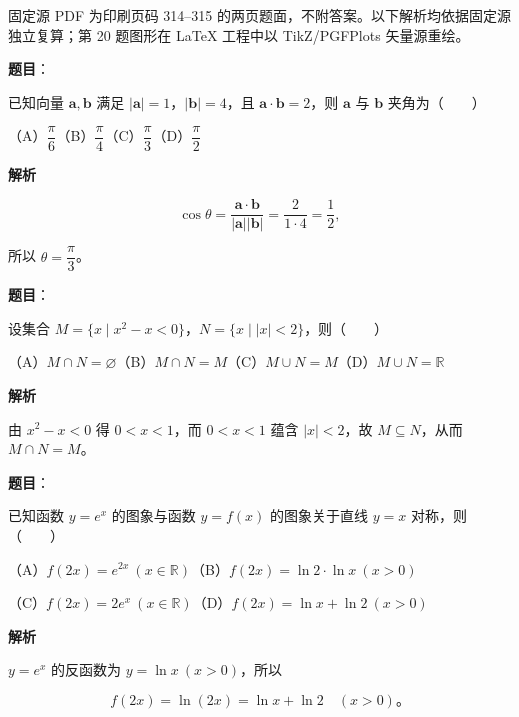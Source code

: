 

\begin{gktip}
固定源 PDF 为印刷页码 314–315 的两页题面，不附答案。以下解析均依据固定源独立复算；第 20 题图形在 LaTeX 工程中以 TikZ/PGFPlots 矢量源重绘。
\end{gktip}

\begin{answer}

\textbf{题目}：

已知向量 $\boldsymbol a,\boldsymbol b$ 满足 $|\boldsymbol a|=1$，$|\boldsymbol b|=4$，且 $\boldsymbol a\cdot\boldsymbol b=2$，则 $\boldsymbol a$ 与 $\boldsymbol b$ 夹角为\mbox{（　　）}

（A）$\dfrac\pi6$\quad（B）$\dfrac\pi4$\quad（C）$\dfrac\pi3$\quad（D）$\dfrac\pi2$

\textbf{解析}

\nopagebreak[4]
\[
\cos\theta=\frac{\boldsymbol a\cdot\boldsymbol b}{|\boldsymbol a||\boldsymbol b|}=\frac{2}{1\cdot4}=\frac12,
\]

所以 $\theta=\dfrac\pi3$。


\end{answer}
\begin{answer}

\textbf{题目}：

设集合 $M=\{x\mid x^2-x<0\}$，$N=\{x\mid |x|<2\}$，则\mbox{（　　）}

（A）$M\cap N=\varnothing$\quad（B）$M\cap N=M$\quad（C）$M\cup N=M$\quad（D）$M\cup N=\mathbb R$

\textbf{解析}

由 $x^2-x<0$ 得 $0<x<1$，而 $0<x<1$ 蕴含 $|x|<2$，故 $M\subseteq N$，从而 $M\cap N=M$。


\end{answer}
\begin{answer}

\textbf{题目}：

已知函数 $y=e^x$ 的图象与函数 $y=f(x)$ 的图象关于直线 $y=x$ 对称，则\mbox{（　　）}

（A）$f(2x)=e^{2x}\ (x\in\mathbb R)$\quad（B）$f(2x)=\ln2\cdot\ln x\ (x>0)$

（C）$f(2x)=2e^x\ (x\in\mathbb R)$\quad（D）$f(2x)=\ln x+\ln2\ (x>0)$

\textbf{解析}

$y=e^x$ 的反函数为 $y=\ln x\ (x>0)$，所以

\nopagebreak[4]
\[
f(2x)=\ln(2x)=\ln x+\ln2\quad(x>0)\text{。}
\]


\end{answer}
